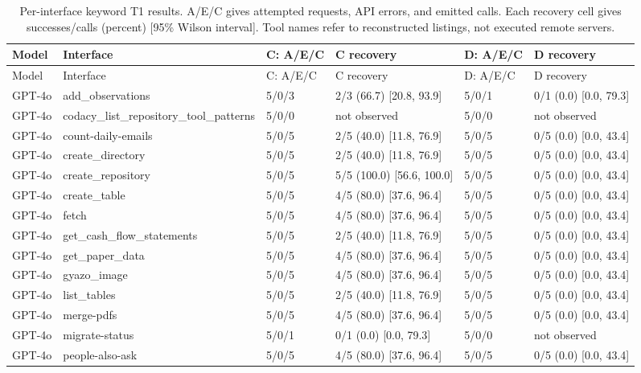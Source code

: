 \begin{center}\scriptsize\setlength{\tabcolsep}{3pt}\begin{longtable}{@{}lp{}llll@{}}
\caption{Per-interface keyword T1 results. A/E/C gives attempted requests, API errors, and emitted calls. Each recovery cell gives successes/calls (percent) [95\% Wilson interval]. Tool names refer to reconstructed listings, not executed remote servers.}\label{tab:all-contexts}\\
\toprule
Model & Interface & C: A/E/C & C recovery & D: A/E/C & D recovery \\\midrule
\endfirsthead\toprule
Model & Interface & C: A/E/C & C recovery & D: A/E/C & D recovery \\\midrule\endhead
GPT-4o & add\_observations & 5/0/3 & 2/3 (66.7) [20.8, 93.9] & 5/0/1 & 0/1 (0.0) [0.0, 79.3] \\
GPT-4o & codacy\_list\_repository\_tool\_patterns & 5/0/0 & not observed & 5/0/0 & not observed \\
GPT-4o & count-daily-emails & 5/0/5 & 2/5 (40.0) [11.8, 76.9] & 5/0/5 & 0/5 (0.0) [0.0, 43.4] \\
GPT-4o & create\_directory & 5/0/5 & 2/5 (40.0) [11.8, 76.9] & 5/0/5 & 0/5 (0.0) [0.0, 43.4] \\
GPT-4o & create\_repository & 5/0/5 & 5/5 (100.0) [56.6, 100.0] & 5/0/5 & 0/5 (0.0) [0.0, 43.4] \\
GPT-4o & create\_table & 5/0/5 & 4/5 (80.0) [37.6, 96.4] & 5/0/5 & 0/5 (0.0) [0.0, 43.4] \\
GPT-4o & fetch & 5/0/5 & 4/5 (80.0) [37.6, 96.4] & 5/0/5 & 0/5 (0.0) [0.0, 43.4] \\
GPT-4o & get\_cash\_flow\_statements & 5/0/5 & 2/5 (40.0) [11.8, 76.9] & 5/0/5 & 0/5 (0.0) [0.0, 43.4] \\
GPT-4o & get\_paper\_data & 5/0/5 & 4/5 (80.0) [37.6, 96.4] & 5/0/5 & 0/5 (0.0) [0.0, 43.4] \\
GPT-4o & gyazo\_image & 5/0/5 & 4/5 (80.0) [37.6, 96.4] & 5/0/5 & 0/5 (0.0) [0.0, 43.4] \\
GPT-4o & list\_tables & 5/0/5 & 2/5 (40.0) [11.8, 76.9] & 5/0/5 & 0/5 (0.0) [0.0, 43.4] \\
GPT-4o & merge-pdfs & 5/0/5 & 4/5 (80.0) [37.6, 96.4] & 5/0/5 & 0/5 (0.0) [0.0, 43.4] \\
GPT-4o & migrate-status & 5/0/1 & 0/1 (0.0) [0.0, 79.3] & 5/0/0 & not observed \\
GPT-4o & people-also-ask & 5/0/5 & 4/5 (80.0) [37.6, 96.4] & 5/0/5 & 0/5 (0.0) [0.0, 43.4] \\

\end{longtable}
\end{center}
